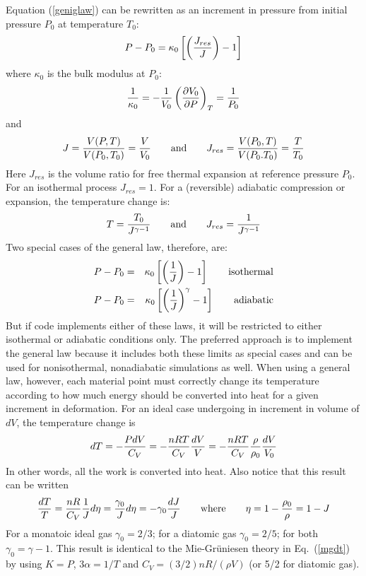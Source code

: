 \documentclass[11pt]{article}
\begin{document}
Equation (\ref{geniglaw}) can be rewritten as an increment in pressure from initial pressure $P_0$ at temperature $T_0$:
\begin{equation}
    P - P_0 = \kappa_0\left[\left(J_{res}\over J\right)-1\right]
\end{equation}
where $\kappa_0$ is the bulk modulus at $P_0$:
\begin{equation}
   {1\over \kappa_0} = -{1\over V_0} \left({\partial V_0\over \partial P}\right)_T = {1\over P_0}
\end{equation}
and
\begin{equation}
    J = {V(P,T)\over V(P_0,T_0)}={V\over V_0} \qquad{\rm and}\qquad J_{res} = {V(P_0,T)\over V(P_0.T_0)} = {T\over T_0}
\end{equation}
Here $J_{res}$ is the volume ratio for free thermal expansion at reference pressure $P_0$. For an isothermal process $J_{res}=1$. For a (reversible) adiabatic compression or expansion, the temperature change is:
\begin{equation}
       T = {T_0\over J^{\gamma-1}} \qquad{\rm and}\qquad J_{res} = {1\over J^{\gamma-1}}
\end{equation}
Two special cases of the general law, therefore, are:
\begin{eqnarray}
   P - P_0 & = & \kappa_0\left[\left(1\over J\right)-1\right]  \qquad{\rm isothermal} \\
   P - P_0 & = & \kappa_0\left[\left(1\over J\right)^\gamma-1\right]  \qquad{\rm adiabatic}
\end{eqnarray}
But if code implements either of these laws, it will be restricted to either isothermal or adiabatic conditions only. The preferred approach is to implement the general law because it includes both these limits as special cases and can be used for nonisothermal, nonadiabatic simulations as well. When using a general law, however, each  material point must correctly change its temperature according to how much energy should be converted into heat for a given increment in deformation. For an ideal case undergoing in increment in volume of $dV$, the temperature change is
\begin{equation}
    dT = -{P dV\over C_V} = -{nRT \over C_V}{dV \over V} = -{nRT \over C_V}{\rho\over\rho_0}{dV \over V_0}
\end{equation}
In other words, all the work is converted into heat. Also notice that this result can be written
\begin{equation}
    {dT\over T} = {nR \over C_V}{1\over J}d\eta = {\gamma_0\over J}d\eta = -\gamma_0{dJ\over J} \qquad{\rm where}\qquad \eta = 1 - {\rho_0\over \rho} = 1 - J
\end{equation}
For a monatoic ideal gas $\gamma_0=2/3$; for a diatomic gas $\gamma_0=2/5$; for both $\gamma_0=\gamma-1$. This result is identical to the Mie-Gr\"{u}niesen theory in Eq.~(\ref{mgdt}) by using $K=P$, $3\alpha=1/T$ and $C_V = (3/2)nR/(\rho V)$ (or 5/2 for diatomic gas).
\end{document}
